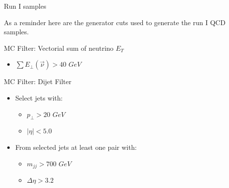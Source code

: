 \documentclass[8pt]{beamer}
\begin{document}
\begin{frame}{Run I samples}

As a reminder here are the generator cuts used to generate the run I QCD samples.

\begin{block}{MC Filter: Vectorial sum of neutrino $E_T$}

\begin{itemize}
  \item $\sum E_\perp(\vec{\nu}) > 40$ $GeV$
\end{itemize}

\end{block}

\begin{block}{MC Filter: Dijet Filter}

\begin{itemize}
  \item Select jets with:
  \begin{itemize}
    \item $p_\perp>20$ $GeV$
    \item $|\eta|<5.0$
  \end{itemize}
  \item From selected jets at least one pair with:
  \begin{itemize}
    \item $m_{jj}>700$ $GeV$
    \item $\Delta\eta>3.2$
  \end{itemize}    
\end{itemize}

\end{block}

\end{frame}
\end{document}
